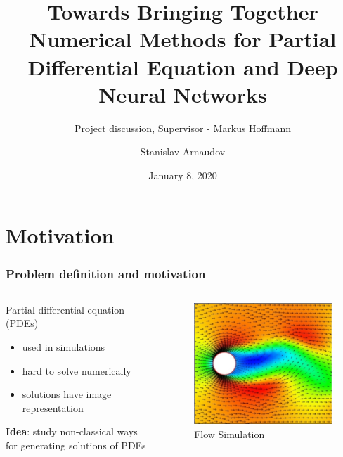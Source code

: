\documentclass[18pt]{beamer}
\title[Project discussion]{Towards Bringing Together Numerical Methods for Partial Differential Equation and Deep Neural Networks}
\subtitle{Project discussion, Supervisor - Markus Hoffmann}
\author{Stanislav Arnaudov}
\institute{Chair for Computer Architecture and Parallel Processing}
\date{January 8, 2020}
\begin{document}
\begin{frame}
 \titlepage
\end{frame}

\section{Motivation}

\begin{frame}
  \frametitle{Problem definition and motivation}
  \begin{columns}
    \begin{column}{0.5\textwidth}
      Partial differential equation (PDEs)
      \begin{itemize}
      \item used in simulations
      \item hard to solve numerically
      \item solutions have image representation
      \end{itemize}
      \vspace{0.25cm}
      \textbf{Idea}: study non-classical ways for generating solutions of PDEs
      \vspace{-0.5cm}
    \end{column}
    \begin{column}{0.5\textwidth}
      \begin{center}
        \begin{figure}[htb]
          \includegraphics[scale=0.35]{images/pde}
          \caption{Flow Simulation\footnotemark}
        \end{figure}
      \end{center}
    \end{column}
  \end{columns}
\end{frame}
\end{document}

